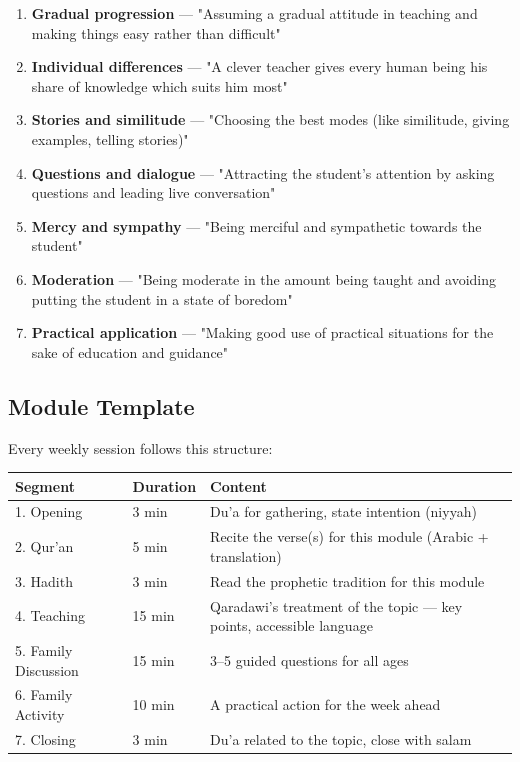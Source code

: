 \documentclass[11pt,a4paper]{article}
\begin{document}
\begin{enumerate}
\item \textbf{Gradual progression} --- "Assuming a gradual attitude in teaching and making things easy rather than difficult"
\item \textbf{Individual differences} --- "A clever teacher gives every human being his share of knowledge which suits him most"
\item \textbf{Stories and similitude} --- "Choosing the best modes (like similitude, giving examples, telling stories)"
\item \textbf{Questions and dialogue} --- "Attracting the student's attention by asking questions and leading live conversation"
\item \textbf{Mercy and sympathy} --- "Being merciful and sympathetic towards the student"
\item \textbf{Moderation} --- "Being moderate in the amount being taught and avoiding putting the student in a state of boredom"
\item \textbf{Practical application} --- "Making good use of practical situations for the sake of education and guidance"
\end{enumerate}


\vspace{6pt}\noindent{\color{border}\rule{\textwidth}{0.5pt}}\vspace{6pt}

\subsection*{Module Template}

Every weekly session follows this structure:

\begin{longtable}{|p{2cm}|p{5cm}|p{8.5cm}|}
\hline
\textbf{\color{accent}Segment} & \textbf{\color{accent}Duration} & \textbf{\color{accent}Content} \\
\hline
1. Opening & 3 min & Du'a for gathering, state intention (niyyah) \\
\hline
2. Qur'an & 5 min & Recite the verse(s) for this module (Arabic + translation) \\
\hline
3. Hadith & 3 min & Read the prophetic tradition for this module \\
\hline
4. Teaching & 15 min & Qaradawi's treatment of the topic --- key points, accessible language \\
\hline
5. Family Discussion & 15 min & 3–5 guided questions for all ages \\
\hline
6. Family Activity & 10 min & A practical action for the week ahead \\
\hline
7. Closing & 3 min & Du'a related to the topic, close with salam \\
\hline
\end{longtable}
\end{document}
